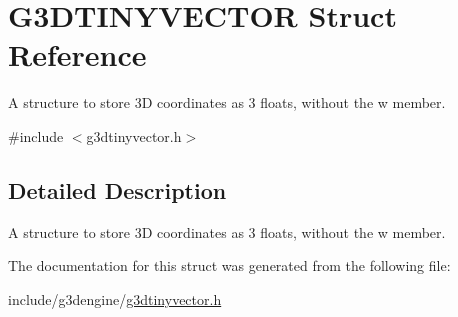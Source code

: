 \hypertarget{structG3DTINYVECTOR}{}\section{G3\+D\+T\+I\+N\+Y\+V\+E\+C\+T\+OR Struct Reference}
\label{structG3DTINYVECTOR}


A structure to store 3D coordinates as 3 floats, without the w member.  




{\ttfamily \#include $<$g3dtinyvector.\+h$>$}



\subsection{Detailed Description}
A structure to store 3D coordinates as 3 floats, without the w member. 

The documentation for this struct was generated from the following file\+:\begin{DoxyCompactItemize}
\item 
include/g3dengine/\hyperlink{g3dtinyvector_8h}{g3dtinyvector.\+h}\end{DoxyCompactItemize}
